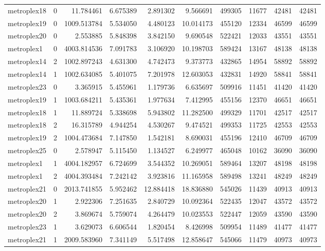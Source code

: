 \begin{longtable}{|l|r|r|r|r|r|r|r|r|r|}
metroplex18 & 0 & 11.784461 & 6.675389 & 2.891302 & 9.566691 & 499305 & 11677 & 42481 & 42481 \\
metroplex19 & 0 & 1009.513784 & 5.534050 & 4.480123 & 10.014173 & 455120 & 12334 & 46599 & 46599 \\
metroplex20 & 0 & 2.553885 & 5.848398 & 3.842150 & 9.690548 & 522421 & 12033 & 43551 & 43551 \\
metroplex1 & 0 & 4003.814536 & 7.091783 & 3.106920 & 10.198703 & 589424 & 13167 & 48138 & 48138 \\
metroplex14 & 2 & 1002.897243 & 4.631300 & 4.742473 & 9.373773 & 432865 & 14954 & 58892 & 58892 \\
metroplex14 & 1 & 1002.634085 & 5.401075 & 7.201978 & 12.603053 & 432831 & 14920 & 58841 & 58841 \\
metroplex23 & 0 & 3.365915 & 5.455961 & 1.179736 & 6.635697 & 509916 & 11451 & 41420 & 41420 \\
metroplex19 & 1 & 1003.684211 & 5.435361 & 1.977634 & 7.412995 & 455156 & 12370 & 46651 & 46651 \\
metroplex18 & 1 & 11.889724 & 5.338698 & 5.943802 & 11.282500 & 499329 & 11701 & 42517 & 42517 \\
metroplex18 & 2 & 16.315789 & 4.944254 & 4.530267 & 9.474521 & 499353 & 11725 & 42553 & 42553 \\
metroplex19 & 2 & 1004.473684 & 7.147850 & 1.542181 & 8.690031 & 455196 & 12410 & 46709 & 46709 \\
metroplex25 & 0 & 2.578947 & 5.115450 & 1.134527 & 6.249977 & 465048 & 10162 & 36090 & 36090 \\
metroplex1 & 1 & 4004.182957 & 6.724699 & 3.544352 & 10.269051 & 589464 & 13207 & 48198 & 48198 \\
metroplex1 & 2 & 4004.393484 & 7.242142 & 3.923816 & 11.165958 & 589498 & 13241 & 48249 & 48249 \\
metroplex21 & 0 & 2013.741855 & 5.952462 & 12.884418 & 18.836880 & 545026 & 11439 & 40913 & 40913 \\
metroplex20 & 1 & 2.922306 & 7.251635 & 2.840729 & 10.092364 & 522435 & 12047 & 43572 & 43572 \\
metroplex20 & 2 & 3.869674 & 5.759074 & 4.264479 & 10.023553 & 522447 & 12059 & 43590 & 43590 \\
metroplex23 & 1 & 3.629073 & 6.606544 & 1.820454 & 8.426998 & 509954 & 11489 & 41477 & 41477 \\
metroplex21 & 1 & 2009.583960 & 7.341149 & 5.517498 & 12.858647 & 545066 & 11479 & 40973 & 40973 \\

\end{longtable}
